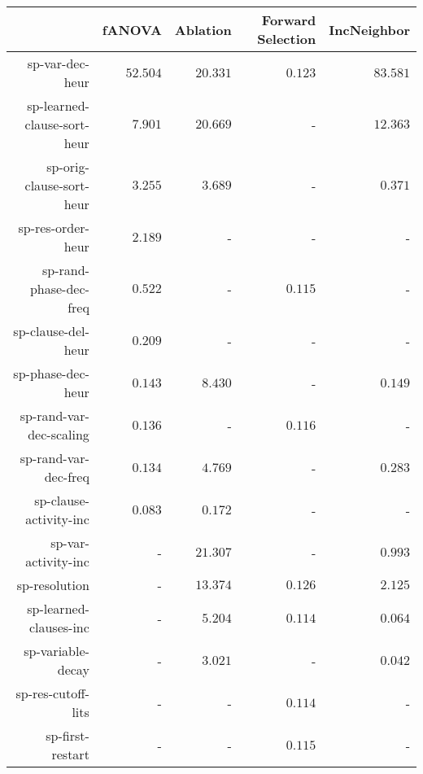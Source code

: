 \begin{table}
\begin{tabular}{r|r|r|r|r}
\toprule
                            &      fANOVA       &     Ablation      & Forward Selection &    IncNeighbor   \\
\hline
sp-var-dec-heur             & $         52.504$ & $         20.331$ & $          0.123$ & $         83.581$\\
sp-learned-clause-sort-heur & $          7.901$ & $         20.669$ &                 - & $         12.363$\\
sp-orig-clause-sort-heur    & $          3.255$ & $          3.689$ &                 - & $          0.371$\\
sp-res-order-heur           & $          2.189$ &                 - &                 - &                 -\\
sp-rand-phase-dec-freq      & $          0.522$ &                 - & $          0.115$ &                 -\\
sp-clause-del-heur          & $          0.209$ &                 - &                 - &                 -\\
sp-phase-dec-heur           & $          0.143$ & $          8.430$ &                 - & $          0.149$\\
sp-rand-var-dec-scaling     & $          0.136$ &                 - & $          0.116$ &                 -\\
sp-rand-var-dec-freq        & $          0.134$ & $          4.769$ &                 - & $          0.283$\\
sp-clause-activity-inc      & $          0.083$ & $          0.172$ &                 - &                 -\\
sp-var-activity-inc         &                 - & $         21.307$ &                 - & $          0.993$\\
sp-resolution               &                 - & $         13.374$ & $          0.126$ & $          2.125$\\
sp-learned-clauses-inc      &                 - & $          5.204$ & $          0.114$ & $          0.064$\\
sp-variable-decay           &                 - & $          3.021$ &                 - & $          0.042$\\
sp-res-cutoff-lits          &                 - &                 - & $          0.114$ &                 -\\
sp-first-restart            &                 - &                 - & $          0.115$ &                 -\\

\end{tabular}
\end{table}
